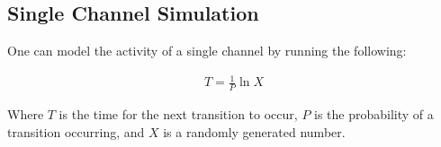 \documentclass[12pt]{amsart}
\begin{document}
\subsection{Single Channel Simulation} One can model the activity of a single channel by running the following: 

\begin{equation} \label{eq8}
\begin{split}
T = \frac{1}{P}\ln X
\end{split}
\end{equation}

Where $T$ is the time for the next transition to occur, $P$ is the probability of a transition occurring, and $X$ is a randomly generated number. 
\end{document}
